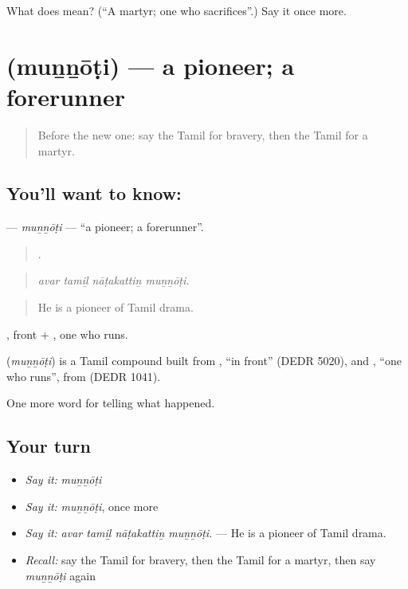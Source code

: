 \begin{tcolorbox}[breakable,colback=teal!4,colframe=teal!35!black,title={Before you move on}]
What does  mean? (\textquotedblleft{}A martyr; one who sacrifices\textquotedblright{}.) Say it once more.
\end{tcolorbox}
\section[\texorpdfstring{\ta{முன்னோடி} (muṉṉōṭi)}{முன்னோடி (muṉṉōṭi)}]{ (muṉṉōṭi) — a pioneer; a forerunner}

\label{lesson:TA-C339-munnoti}



\begin{quote}
Before the new one: say the Tamil for bravery, then the Tamil for a martyr.
\end{quote}

\subsection*{You'll want to know: }
\textbf{} — \emph{muṉṉōṭi} — \textquotedblleft{}a pioneer; a forerunner\textquotedblright{}.

\begin{quote}
   .
\end{quote}

\begin{quote}
\emph{avar tamiḻ nāṭakattiṉ muṉṉōṭi.}
\end{quote}

\begin{quote}
He is a pioneer of Tamil drama.
\end{quote}

, front + , one who runs.

\begin{cousinweb}
\textbf{} (\emph{muṉṉōṭi}) is a Tamil compound built from , \textquotedblleft{}in front\textquotedblright{} (DEDR 5020), and , \textquotedblleft{}one who runs\textquotedblright{}, from  (DEDR 1041).
\end{cousinweb}

\begin{grammarlens}[title={What you've built}]
One more word for telling what happened.
\end{grammarlens}

\subsection*{Your turn}
\begin{itemize}
\raggedright
  \item \emph{Say it:} \emph{muṉṉōṭi}
  \item \emph{Say it:} \emph{muṉṉōṭi}, once more
  \item \emph{Say it:} \emph{avar tamiḻ nāṭakattiṉ muṉṉōṭi.} — He is a pioneer of Tamil drama.
  \item \emph{Recall:} say the Tamil for bravery, then the Tamil for a martyr, then say \emph{muṉṉōṭi} again
\end{itemize}

